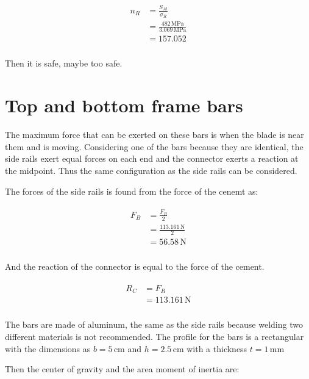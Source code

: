 \documentclass{article}
\begin{document}
\begin{align}
\begin{split}
n_{R}	&= \frac{S_{Al}}{\sigma_{R}}\\
		&= \frac{482\,\mathrm{MPa}}{3.069\,\mathrm{MPa}}\\
		&= 157.052\\
\end{split}
\end{align}

Then it is safe, maybe too safe.

\section{Top and bottom frame bars}

The maximum force that can be exerted on these bars is when the blade is near them and is
moving. Considering one of the bars because they are identical, the side rails exert equal forces on each end and the connector exerts a reaction at the midpoint. Thus the same
configuration as the side rails can be considered.

The forces of the side rails is found from the force of the cenemt as:

\begin{align}
\begin{split}
F_{B}	&= \frac{F_{R}}{2}\\
		&= \frac{113.161\,\mathrm{N}}{2}\\
		&= 56.58\,\mathrm{N}\\
\end{split}
\end{align}

And the reaction of the connector is equal to the force of the cement.

\begin{align}
\begin{split}
R_{C}	&= F_{R}\\
		&= 113.161\,\mathrm{N}\\
\end{split}
\end{align}

The bars are made of aluminum, the same as the side rails because welding two different
materials is not recommended. The profile for the bars is a rectangular with the dimensions as $b = 5\,\mathrm{cm}$ and $h = 2.5\,\mathrm{cm}$ with a thickness $t = 1\,\mathrm{mm}$

Then the center of gravity and the area moment of inertia are:
\end{document}
